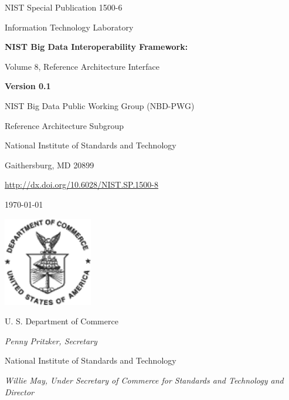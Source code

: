 \begin{flushright}
NIST Special Publication 1500-6

Information Technology Laboratory

\bigskip 

{\Huge\bf\sf NIST Big Data Interoperability Framework:

\bigskip

Volume 8, Reference Architecture Interface
}

\bigskip

{\bf Version 0.1}

\bigskip \bigskip \bigskip \bigskip \bigskip \bigskip

NIST Big Data Public Working Group (NBD-PWG)

Reference Architecture Subgroup

National Institute of Standards and Technology

Gaithersburg, MD 20899

\bigskip

\url{http://dx.doi.org/10.6028/NIST.SP.1500-8}

\bigskip

\today

\vfill

\begin{flushright}
\includegraphics{images/dep-commerce.png}
\end{flushright}

 
U. S. Department of Commerce

{\it Penny Pritzker, Secretary}

\bigskip
National Institute of Standards and Technology

{\it Willie May, Under Secretary of Commerce for Standards and Technology and Director}
\end{flushright}


